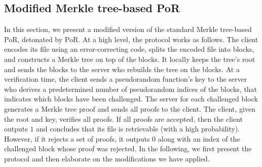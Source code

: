 


\subsection{Modified Merkle tree-based PoR}\label{protocol::PoR}

In this section, we present a modified version of the standard Merkle tree-based PoR, detonated by PoR. At a high level, the protocol works as follows. The client encodes its file using an error-correcting code, splits the encoded file into blocks, and constructs a Merkle tree on top of the blocks. It locally keeps the tree's root and sends the blocks to the server who rebuilds the tree on the blocks. At a verification time, the client sends a pseudorandom function's key to the server who derives a predetermined number of pseudorandom  indices of the blocks, that indicates which blocks have been challenged. The server for each challenged block generates a Merkle tree proof and sends all proofs to the client. The client, given the root and   key, verifies all  proofs. If all proofs are accepted, then the client outputs $1$ and concludes that its file is retrievable (with a high probability). However, if  it rejects a set of proofs, it outputs $0$ along with an index of the challenged block whose proof was rejected. In the following, we first present the protocol and then elaborate on the  modifications we have applied. 


